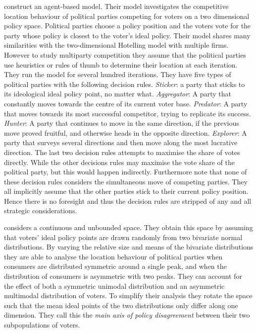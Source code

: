\documentclass[preprint, 12pt]{elsarticle}
\begin{document}
\citet{Laver_Sergenti_2011} construct an agent-based model. Their model investigates the competitive location behaviour of political parties competing for voters on a two dimensional policy space. Political parties choose a policy position and the voters vote for the party whose policy is closest to the voter's ideal policy. Their model shares many similarities with the two-dimensional Hotelling model with multiple firms. However to study multiparty competition they assume that the political parties use heuristics or rules of thumb to determine their location at each iteration. They run the model for several hundred iterations. They have five types of political parties with the following decision rules. \emph{Sticker}: a party that sticks to its ideological ideal policy point, no matter what. \emph{Aggregator}: A party that constantly moves towards the centre of its current voter base. \emph{Predator}: A party that moves towards its most successful competitor, trying to replicate its success. \emph{Hunter}: A party that continues to move in the same direction, if the previous move proved fruitful, and otherwise heads in the opposite direction. \emph{Explorer}: A party that surveys several directions and then move along the most lucrative direction. The last two decision rules attempts to maximise the share of votes directly. While the other decisions rules may maximise the vote share of the political party, but this would happen indirectly. Furthermore note that none of these decision rules considers the simultaneous move of competing parties. They all implicitly assume that the other parties stick to their current policy position. Hence there is no foresight and thus the decision rules are stripped of any and all strategic considerations.

\citet{Laver_Sergenti_2011} considers a continuous and unbounded space. They obtain this space by assuming that voters' ideal policy points are drawn randomly from two bivariate normal distributions. By varying the relative size and means of the bivariate distributions they are able to analyse the location behaviour of political parties when consumers are distributed symmetric around a single peak, and when the distribution of consumers is asymmetric with two peaks. They can account for the effect of both a symmetric unimodal distribution and an asymmetric multimodal distribution of voters. To simplify their analysis they rotate the space such that the mean ideal points of the two distributions only differ along one dimension. They call this the \emph{main axis of policy disagreement} between their two subpopulations of voters.
\end{document}
